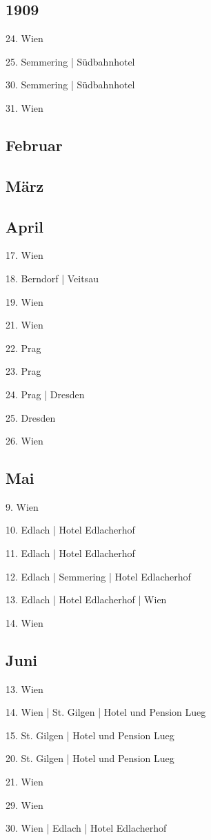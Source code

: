 \documentclass[twoside=false,titlepage=false,open=any, parskip=never, fontsize=10pt, headings=small, chapterprefix=false, appendixprefix=false, DIV=15]{scrbook}
\begin{document}
\begin{multicols}{3}
            \chapter*{1909}
            24. Wien\par
            25. Semmering | Südbahnhotel\par
            30. Semmering | Südbahnhotel\par
            31. Wien\par
            \section*{Februar}
            \section*{März}
            \section*{April}
            17. Wien\par
            18. Berndorf | Veitsau\par
            19. Wien\par
            21. Wien\par
            22. Prag\par
            23. Prag\par
            24. Prag | Dresden\par
            25. Dresden\par
            26. Wien\par
            \section*{Mai}
            9. Wien\par
            10. Edlach | Hotel Edlacherhof\par
            11. Edlach | Hotel Edlacherhof\par
            12. Edlach | Semmering | Hotel Edlacherhof\par
            13. Edlach | Hotel Edlacherhof | Wien\par
            14. Wien\par
            \section*{Juni}
            13. Wien\par
            14. Wien | St. Gilgen | Hotel und Pension Lueg\par
            15. St. Gilgen | Hotel und Pension Lueg\par
            20. St. Gilgen | Hotel und Pension Lueg\par
            21. Wien\par
            29. Wien\par
            30. Wien | Edlach | Hotel Edlacherhof\par

\end{multicols}
\end{document}
